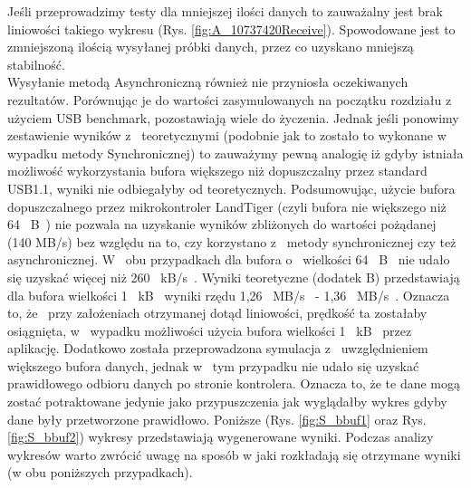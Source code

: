 \documentclass{BscUS}
\begin{document}
\noindent Jeśli przeprowadzimy testy dla mniejszej ilości danych to zauważalny jest brak liniowości takiego wykresu (Rys. \ref{fig:A_10737420Receive}). Spowodowane jest to zmniejszoną ilością wysyłanej próbki danych, przez co uzyskano mniejszą stabilność. \\
\indent Wysyłanie metodą Asynchroniczną również nie przyniosła oczekiwanych rezultatów. Porównując je do wartości zasymulowanych na początku rozdziału z~ użyciem USB benchmark, pozostawiają wiele do życzenia. Jednak jeśli ponowimy zestawienie wyników z~ teoretycznymi (podobnie jak to zostało to wykonane w~ wypadku metody Synchronicznej) to zauważymy pewną analogię iż gdyby istniała możliwość wykorzystania bufora większego niż dopuszczalny przez standard USB1.1, wyniki nie odbiegałyby od teoretycznych.
\newline
\indent Podsumowując, użycie bufora dopuszczalnego przez mikrokontroler LandTiger (czyli bufora nie większego niż 64~ B~) nie pozwala na uzyskanie wyników zbliżonych do wartości pożądanej (140 MB/s) bez względu na to, czy korzystano z~ metody synchronicznej czy też asynchronicznej. W~ obu przypadkach dla bufora o~ wielkości 64~ B~ nie udało się uzyskać więcej niż 260~ kB/s~. Wyniki teoretyczne (dodatek B) przedstawiają dla bufora wielkości 1~ kB~ wyniki rzędu 1,26~ MB/s~ - 1,36~ MB/s~. Oznacza to, że~ przy założeniach otrzymanej dotąd liniowości, prędkość ta zostałaby osiągnięta, w~ wypadku możliwości użycia bufora wielkości 1~ kB~ przez aplikację.
\newline
\indent Dodatkowo została przeprowadzona symulacja z~ uwzględnieniem większego bufora danych, jednak w~ tym przypadku nie udało się uzyskać prawidłowego odbioru danych  po stronie kontrolera. Oznacza to, że te dane mogą zostać potraktowane jedynie jako przypuszczenia jak wyglądałby wykres gdyby dane były przetworzone prawidłowo. Poniższe (Rys. \ref{fig:S_bbuf1} oraz Rys. \ref{fig:S_bbuf2}) wykresy przedstawiają wygenerowane wyniki. Podczas analizy wykresów warto zwrócić uwagę na sposób w jaki rozkładają się otrzymane wyniki (w obu poniższych przypadkach).
\end{document}
